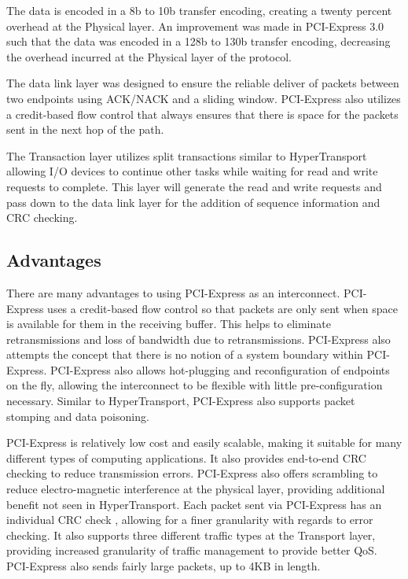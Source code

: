 \documentclass[conference]{IEEEtran}
\begin{document}
The data is encoded in a 8b to 10b transfer
encoding, creating a twenty percent overhead at the Physical layer. An
improvement was made in PCI-Express 3.0 such that the data was encoded in a 128b
to 130b transfer encoding, decreasing the overhead incurred at the Physical
layer of the protocol.

The data link layer was designed to ensure the reliable deliver of packets
between two endpoints using ACK/NACK and a sliding window. PCI-Express also
utilizes a credit-based flow control that always ensures that there is space for
the packets sent in the next hop of the path.

The Transaction layer utilizes split transactions similar to HyperTransport
allowing I/O devices to continue other tasks while waiting for read and write
requests to complete. This layer will generate the read and write requests and
pass down to the data link layer for the addition of sequence information and
CRC checking. 

\subsection{Advantages}
\label{sec:pci:advant}

There are many advantages to using PCI-Express as an interconnect. PCI-Express
uses a credit-based flow control so that packets are only sent when space is
available for them in the receiving buffer. This helps to eliminate
retransmissions and loss of bandwidth due to retransmissions. PCI-Express also
attempts the concept that there is no notion of a system boundary within
PCI-Express\cite{mayhew2003pci}. PCI-Express also allows hot-plugging and
reconfiguration of endpoints on the fly, allowing the interconnect to be
flexible with little pre-configuration necessary. Similar to HyperTransport,
PCI-Express also supports packet stomping and data
poisoning\cite{holden2006latency}. 

PCI-Express is relatively low cost and easily scalable, making it suitable for
many different types of computing applications. It also provides end-to-end CRC
checking to reduce transmission errors. PCI-Express also offers scrambling to
reduce electro-magnetic interference at the physical layer, providing additional
benefit not seen in HyperTransport. Each packet sent via PCI-Express has an individual CRC check ,
allowing for a finer granularity with regards to error checking. It also
supports three different traffic types at the Transport layer, providing
increased granularity of traffic management to provide better QoS. PCI-Express
also sends fairly large packets, up to 4KB in length.
\end{document}
